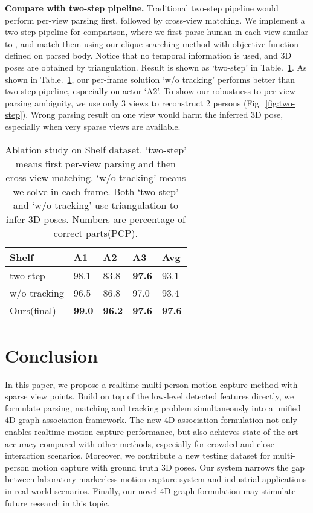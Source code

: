 \documentclass[10pt,twocolumn,letterpaper]{article}
\begin{document}
\noindent\textbf{Compare with two-step pipeline. }
Traditional two-step pipeline would perform per-view parsing first, followed by cross-view matching. We implement a two-step pipeline for comparison, where we first parse human in each view similar to \cite{cao2018openpose}, and match them using our clique searching method with objective function defined on parsed body. Notice that no temporal information is used, and 3D poses are obtained by triangulation. Result is shown as `two-step' in Table.~\ref{tab:ablation}. As shown in Table.~\ref{tab:ablation}, our per-frame  solution `w/o tracking' performs better than two-step pipeline, especially on actor `A2'. To show our robustness to per-view parsing ambiguity, we use only 3 views to reconstruct 2 persons (Fig.~\ref{fig:two-step}). Wrong parsing result on one view would harm the inferred 3D pose, especially when very sparse views are available.

\begin{table}[ht]
\centering
\begin{tabular}{lllll}
\hline
Shelf             & A1        & A2         & A3         & Avg            \\ \hline
two-step       &98.1  & 83.8          & \textbf{97.6}        & 93.1           \\
w/o tracking      & 96.5      & 86.8       & 97.0       & 93.4       \\
Ours(final)       & \textbf{99.0} & \textbf{96.2} & \textbf{97.6} & \textbf{97.6}    \\ \hline
\end{tabular}
\vspace{2mm}
\caption{Ablation study on Shelf dataset. `two-step' means first per-view parsing and then cross-view matching. `w/o tracking' means we solve  in each frame. Both `two-step' and `w/o tracking' use triangulation to infer 3D poses. Numbers are percentage of correct parts(PCP).}
\label{tab:ablation}
\end{table}

%
 \vspace{-2mm}

\section{Conclusion}
\label{sec:discussion}
In this paper, we propose a realtime multi-person motion capture method with sparse view points. 
Build on top of the low-level detected features directly, we formulate parsing, matching and tracking problem simultaneously into a unified 4D graph association framework. 
The new 4D association formulation not only enables realtime motion capture performance, but also achieves state-of-the-art accuracy compared with other methods, especially for crowded and close interaction scenarios. Moreover, we contribute a new testing dataset for multi-person motion capture with ground truth 3D poses. 
Our system narrows the gap between laboratory markerless motion capture system and industrial applications in real world scenarios. 
Finally, our novel 4D graph formulation may stimulate future research in this topic.  
{\small


}
\end{document}
